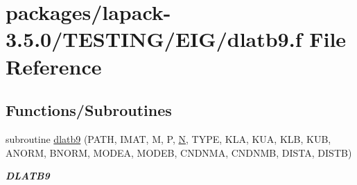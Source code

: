 \hypertarget{dlatb9_8f}{}\section{packages/lapack-\/3.5.0/\+T\+E\+S\+T\+I\+N\+G/\+E\+I\+G/dlatb9.f File Reference}
\label{dlatb9_8f}
\subsection*{Functions/\+Subroutines}
\begin{DoxyCompactItemize}
\item 
subroutine \hyperlink{group__double__eig_gab048b044b8daf142a4780aa5dd1e68ab}{dlatb9} (P\+A\+T\+H, I\+M\+A\+T, M, P, \hyperlink{polmisc_8c_a0240ac851181b84ac374872dc5434ee4}{N}, T\+Y\+P\+E, K\+L\+A, K\+U\+A, K\+L\+B, K\+U\+B, A\+N\+O\+R\+M, B\+N\+O\+R\+M, M\+O\+D\+E\+A, M\+O\+D\+E\+B, C\+N\+D\+N\+M\+A, C\+N\+D\+N\+M\+B, D\+I\+S\+T\+A, D\+I\+S\+T\+B)
\begin{DoxyCompactList}\small\item\em {\bfseries D\+L\+A\+T\+B9} \end{DoxyCompactList}\end{DoxyCompactItemize}
